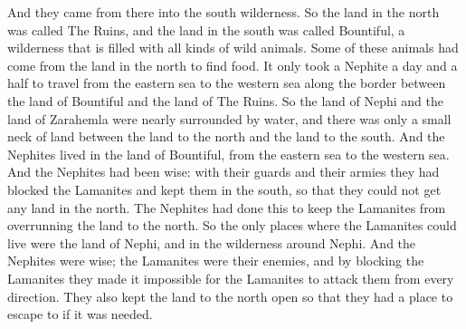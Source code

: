 \bverse \iffalse And they came from there up into the south wilderness. Thus the land on the northward was called Desolation, and the land on the southward was called Bountiful, it being the wilderness which is filled with all manner of wild animals of every kind, a part of which had come from the land northward for food. \fi
And they came from there into the south wilderness. So the land in the north was called The Ruins, and the land in the south was called Bountiful, a wilderness that is filled with all kinds of wild animals. Some of these animals had come from the land in the north to find food.
\bverse \iffalse And now, it was only the distance of a day and a half's journey for a Nephite, on the line Bountiful and the land Desolation, from the east to the west sea; and thus the land of Nephi and the land of Zarahemla were nearly surrounded by water, there being a small neck of land between the land northward and the land southward. \fi
It only took a Nephite a day and a half to travel from the eastern sea to the western sea along the border between the land of Bountiful and the land of The Ruins. So the land of Nephi and the land of Zarahemla were nearly surrounded by water, and there was only a small neck of land between the land to the north and the land to the south.
\bverse \iffalse And it came to pass that the Nephites had inhabited the land Bountiful, even from the east unto the west sea, and thus the Nephites in their wisdom, with their guards and their armies, had hemmed in the Lamanites on the south, that thereby they should have no more possession on the north, that they might not overrun the land northward. \fi
And the Nephites lived in the land of Bountiful, from the eastern sea to the western sea. And the Nephites had been wise: with their guards and their armies they had blocked the Lamanites and kept them in the south, so that they could not get any land in the north. The Nephites had done this to keep the Lamanites from overrunning the land to the north.
\bverse \iffalse Therefore the Lamanites could have no more possessions only in the land of Nephi, and the wilderness round about. Now this was wisdom in the Nephites--as the Lamanites were an enemy to them, they would not suffer their afflictions on every hand, and also that they might have a country whither they might flee, according to their desires. \fi
So the only places where the Lamanites could live were the land of Nephi, and in the wilderness around Nephi. And the Nephites were wise; the Lamanites were their enemies, and by blocking the Lamanites they made it impossible for the Lamanites to attack them from every direction. They also kept the land to the north open so that they had a place to escape to if it was needed.
